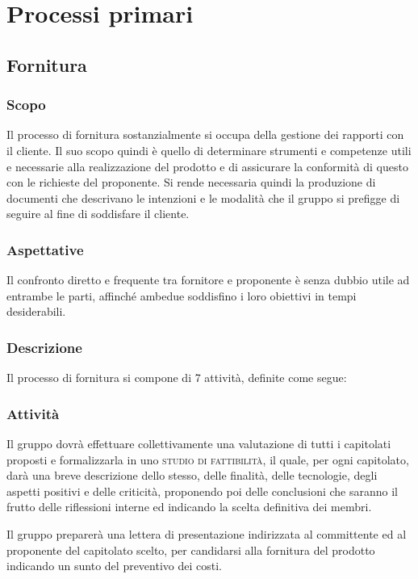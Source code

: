 \section{Processi primari}
\subsection{Fornitura}
    \subsubsection{Scopo}
        Il processo di fornitura sostanzialmente si occupa della gestione dei rapporti con il cliente.
        Il suo scopo quindi è quello di determinare strumenti e competenze utili e necessarie alla realizzazione del prodotto e di assicurare la conformità di questo con le richieste del proponente. Si rende necessaria quindi la produzione di documenti che descrivano le intenzioni e le modalità che il gruppo si prefigge di seguire al fine di soddisfare il cliente.
    \subsubsection{Aspettative}
        Il confronto diretto e frequente tra fornitore e proponente è senza dubbio utile ad entrambe le parti, affinché ambedue soddisfino i loro obiettivi in tempi desiderabili.
    \subsubsection{Descrizione}
        Il processo di fornitura si compone  di 7 attività, definite come segue:
    \subsubsection{Attività}
            Il gruppo dovrà effettuare collettivamente una valutazione di tutti i capitolati proposti e formalizzarla in uno \textsc{studio di fattibilità}, il quale, per ogni capitolato, darà una breve descrizione dello stesso, delle finalità, delle tecnologie, degli aspetti positivi e delle criticità, proponendo poi delle conclusioni che saranno il frutto delle riflessioni interne ed indicando la scelta definitiva dei membri.

            Il gruppo preparerà una lettera di presentazione indirizzata al committente ed al proponente del capitolato scelto, per candidarsi alla fornitura del prodotto indicando un sunto del preventivo dei costi.

